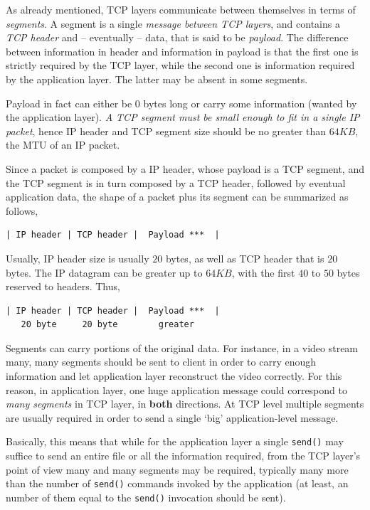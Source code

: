 \documentclass[10pt]{extreport}
\begin{document}
As already mentioned, TCP layers communicate between themselves in terms of
\emph{segments}. A segment is a single \emph{message between TCP layers}, and
contains a \emph{TCP header} and \--- eventually \--- data, that is said to be
\emph{payload}. The difference between information in header and information in
payload is that the first one is strictly required by the TCP layer, while the
second one is information required by the application layer. The latter may be
absent in some segments.

Payload in fact can either be $0$ bytes long or carry some information (wanted
by the application layer). \emph{A TCP segment must be small enough to fit in a
single IP packet}, hence IP header and TCP segment size should be no greater
than $64KB$, the MTU of an IP packet.

Since a packet is composed by a IP header, whose payload is a TCP segment, and the
TCP segment is in turn composed by a TCP header, followed by eventual
application data, the shape of a packet plus its segment can be summarized as
follows,

\begin{verbatim}
| IP header | TCP header |  Payload ***  |
\end{verbatim}

Usually, IP header size is usually $20$ bytes, as well as TCP
header that is $20$ bytes. The IP datagram can be greater up to $64KB$, with
the first $40$ to $50$ bytes reserved to headers. Thus,

\begin{verbatim}
| IP header | TCP header |  Payload ***  |
   20 byte     20 byte        greater
\end{verbatim}

Segments can carry portions of the original data. For instance, in a video
stream many, many segments should be sent to client in order to carry enough
information and let application layer reconstruct the video correctly. For
this reason, in application layer, one huge application message could correspond to
\emph{many segments} in TCP layer, in \textbf{both} directions. At TCP
level multiple segments are usually required in order to send a single
`big' application-level message.

Basically, this means that while for the application layer a single
\texttt{send()} may suffice to send an entire file or all the information
required, from the TCP layer's point of view many and many segments may be
required, typically many more than the number of \texttt{send()} commands
invoked by the application (at least, an number of them equal to the
\texttt{send()} invocation should be sent).
\end{document}
